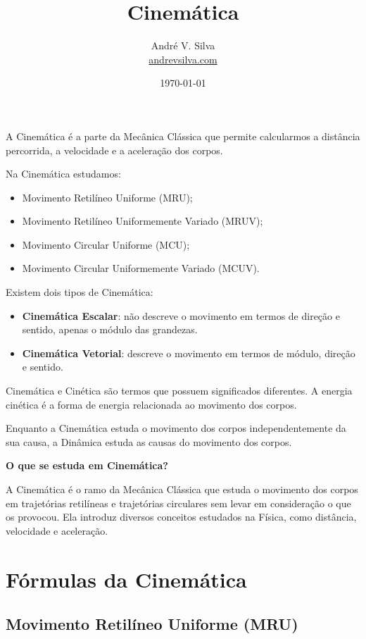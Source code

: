 \documentclass[a4paper,12pt]{article}
\title{\Large Cinemática}
\author{Andr\'e V. Silva \\ \href{https://andrevsilva.com/}{andrevsilva.com}}
\date{\today}
\begin{document}
\maketitle

\tableofcontents

\newpage

A Cinemática é a parte da Mecânica Clássica que permite calcularmos a distância percorrida, 
a velocidade e a aceleração dos corpos.

Na Cinemática estudamos:
\begin{itemize}
    \item Movimento Retilíneo Uniforme (MRU);
    \item Movimento Retilíneo Uniformemente Variado (MRUV);
    \item Movimento Circular Uniforme (MCU);
    \item Movimento Circular Uniformemente Variado (MCUV).
\end{itemize}

Existem dois tipos de Cinemática:
\begin{itemize}
    \item \textbf{Cinemática Escalar}: não descreve o movimento em termos de direção e sentido, 
    apenas o módulo das grandezas.
    \item \textbf{Cinemática Vetorial}: descreve o movimento em termos de módulo, direção e sentido.
\end{itemize}

Cinemática e Cinética são termos que possuem significados diferentes. A energia cinética é a 
forma de energia relacionada ao movimento dos corpos.

Enquanto a Cinemática estuda o movimento dos corpos independentemente da sua causa, a Dinâmica 
estuda as causas do movimento dos corpos.

\textbf{O que se estuda em Cinemática?}

A Cinemática é o ramo da Mecânica Clássica que estuda o movimento dos corpos em trajetórias retilíneas 
e trajetórias circulares sem levar em consideração o que os provocou. Ela introduz diversos conceitos 
estudados na Física, como distância, velocidade e aceleração.

\section{\Large Fórmulas da Cinemática}

\subsection{Movimento Retilíneo Uniforme (MRU)}
\end{document}
